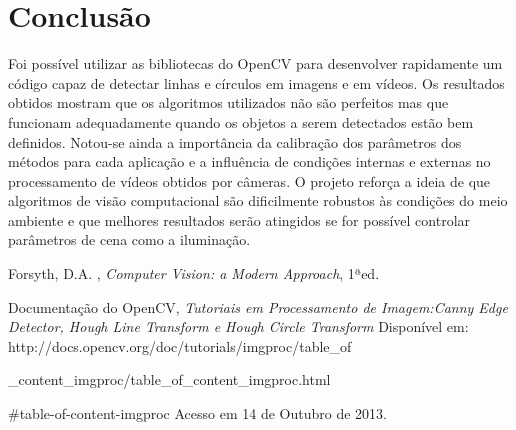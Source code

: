 \documentclass[journal]{IEEEtran}
\begin{document}
	\section{Conclusão}
		Foi possível utilizar as bibliotecas do OpenCV para desenvolver rapidamente um código 
	capaz de detectar linhas e círculos em imagens e em vídeos. Os resultados obtidos 
	mostram que os algoritmos utilizados não são perfeitos mas que funcionam adequadamente
	quando os objetos a serem detectados estão bem definidos. Notou-se ainda a importância
	da calibração dos parâmetros dos métodos para cada aplicação e a influência de condições
	internas e externas no processamento de vídeos obtidos por câmeras. O projeto reforça a
	ideia de que algoritmos de visão computacional são dificilmente robustos às condições do 
	meio ambiente e que melhores resultados serão atingidos se for possível controlar
	parâmetros de cena como a iluminação. 

\begin{thebibliography}{1}

Forsyth, D.A. , \emph{Computer Vision: a Modern Approach}, 1ªed.

 Documentação do OpenCV, \emph{Tutoriais em Processamento de Imagem:Canny Edge Detector, Hough Line Transform e
 Hough Circle Transform}
 Disponível em: http://docs.opencv.org/doc/tutorials/imgproc/table\_of
 
 \_content\_imgproc/table\_of\_content\_imgproc.html
 
 \#table-of-content-imgproc
	 Acesso em 14 de Outubro de 2013.
\end{thebibliography}
\end{document}
